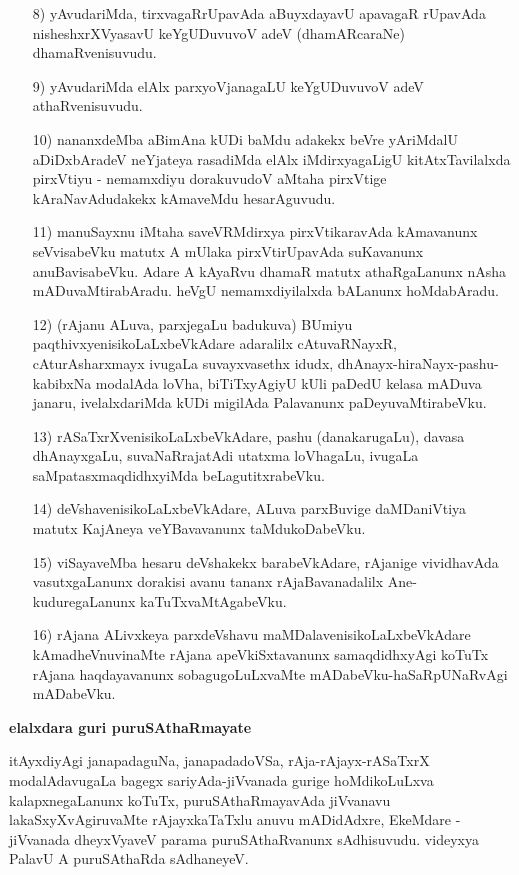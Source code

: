 \begin{itemize}
\item [8)] yAvudariMda, tirxvagaRrUpavAda aBuyxdayavU apavagaR rUpavAda nisheshxrXVyasavU keYgUDuvuvoV adeV (dhamARcaraNe) dhamaRvenisuvudu.
\item [9)] yAvudariMda elAlx parxyoVjanagaLU keYgUDuvuvoV adeV athaRvenisuvudu.
\item [10)] nananxdeMba aBimAna kUDi baMdu adakekx beVre yAriMdalU aDiDxbAradeV neYjateya rasadiMda elAlx iMdirxyagaLigU kitAtxTavilalxda pirxVtiyu - nemamxdiyu dorakuvudoV aMtaha pirxVtige kAraNavAdudakekx kAmaveMdu hesarAguvudu. 
\item [11)] manuSayxnu iMtaha saveVRMdirxya pirxVtikaravAda kAmavanunx seVvisabeVku matutx A mUlaka pirxVtirUpavAda suKavanunx anuBavisabeVku. Adare A kAyaRvu dhamaR matutx athaRgaLanunx nAsha mADuvaMtirabAradu. heVgU nemamxdiyilalxda bALanunx hoMdabAradu.
\item [12)] (rAjanu ALuva, parxjegaLu badukuva) BUmiyu paqthivxyenisikoLaLxbeVkAdare adaralilx cAtuvaRNayxR, cAturAsharxmayx ivugaLa suvayxvasethx idudx, dhAnayx-hiraNayx-pashu-kabibxNa modalAda loVha, biTiTxyAgiyU kUli paDedU kelasa mADuva janaru, ivelalxdariMda kUDi migilAda Palavanunx paDeyuvaMtirabeVku.
\item [13)] rASaTxrXvenisikoLaLxbeVkAdare, pashu (danakarugaLu), davasa dhAnayxgaLu, suvaNaRrajatAdi utatxma loVhagaLu, ivugaLa saMpatasxmaqdidhxyiMda beLagutitxrabeVku.
\item [14)] deVshavenisikoLaLxbeVkAdare, ALuva parxBuvige daMDaniVtiya matutx KajAneya veYBavavanunx taMdukoDabeVku.
\item [15)] viSayaveMba hesaru deVshakekx barabeVkAdare, rAjanige vividhavAda vasutxgaLanunx dorakisi avanu tananx rAjaBavanadalilx Ane-kuduregaLanunx kaTuTxvaMtAgabeVku.
\item [16)] rAjana ALivxkeya parxdeVshavu maMDalavenisikoLaLxbeVkAdare kAmadheVnuvinaMte rAjana apeVkiSxtavanunx samaqdidhxyAgi koTuTx rAjana haqdayavanunx sobagugoLuLxvaMte mADabeVku-haSaRpUNaRvAgi mADabeVku.
\end{itemize}

\noindent
\textbf{elalxdara guri puruSAthaRmayate}\label{page96}

itAyxdiyAgi janapadaguNa, janapadadoVSa, rAja-rAjayx-rASaTxrX modalAdavugaLa bagegx sariyAda-jiVvanada gurige hoMdikoLuLxva kalapxnegaLanunx koTuTx, puruSAthaRmayavAda jiVvanavu lakaSxyXvAgiruvaMte rAjayxkaTaTxlu anuvu mADidAdxre, EkeMdare - jiVvanada dheyxVyaveV parama puruSAthaRvanunx sAdhisuvudu. videyxya PalavU A puruSAthaRda sAdhaneyeV.

